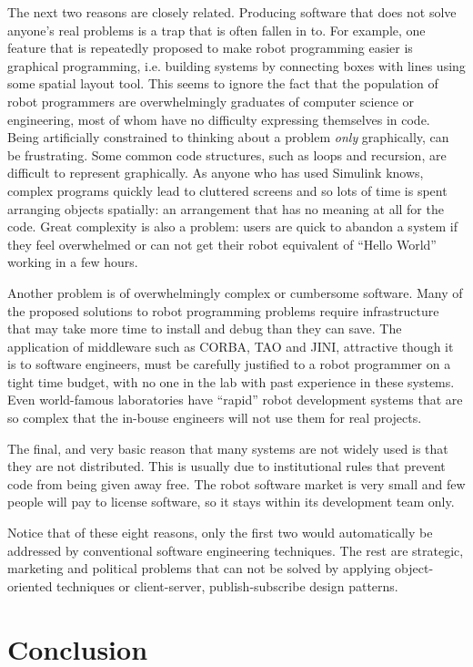 The next two reasons are closely related. Producing software that does
not solve anyone's real problems is a trap that is often fallen in
to. For example, one feature that is repeatedly proposed to make robot
programming easier is graphical programming, i.e. building systems by
connecting boxes with lines using some spatial layout tool. This seems
to ignore the fact that the population of robot programmers are
overwhelmingly graduates of computer science or engineering, most of
whom have no difficulty expressing themselves in code. Being
artificially constrained to thinking about a problem {\it only}
graphically, can be frustrating. Some common code structures, such as
loops and recursion, are difficult to represent graphically. As anyone
who has used Simulink knows, complex programs quickly lead to
cluttered screens and so lots of time is spent arranging objects
spatially: an arrangement that has no meaning at all for the
code. Great complexity is also a problem: users are quick to abandon a
system if they feel overwhelmed or can not get their robot equivalent
of ``Hello World'' working in a few hours.

Another problem is of overwhelmingly complex or cumbersome
software. Many of the proposed solutions to robot programming problems
require infrastructure that may take more time to install and debug
than they can save. The application of middleware such as CORBA, TAO
and JINI, attractive though it is to software engineers, must be
carefully justified to a robot programmer on a tight time budget, with
no one in the lab with past experience in these systems. Even
world-famous laboratories have ``rapid'' robot development systems
that are so complex that the in-bouse engineers will not use them for
real projects.

The final, and very basic reason that many systems are not widely used
is that they are not distributed. This is usually due to institutional
rules that prevent code from being given away free. The robot software
market is very small and few people will pay to license software, so
it stays within its development team only.

Notice that of these eight reasons, only the first two would
automatically be addressed by conventional software engineering
techniques. The rest are strategic, marketing and political problems
that can not be solved by applying object-oriented techniques or
client-server, publish-subscribe design patterns.

\section{Conclusion}

